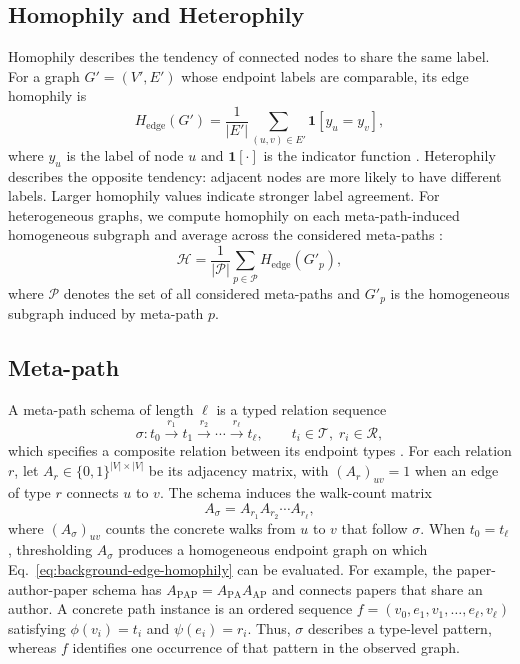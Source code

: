 \subsection{Homophily and Heterophily}
Homophily describes the tendency of connected nodes to share the same label. For a graph
$G'=(V',E')$ whose endpoint labels are comparable, its edge homophily is
\begin{equation}
  H_{\mathrm{edge}}(G')
  = \frac{1}{|E'|}\sum_{(u,v)\in E'}\mathbf{1}[y_u=y_v],
  \label{eq:background-edge-homophily}
\end{equation}
where $y_u$ is the label of node $u$ and $\mathbf{1}[\cdot]$ is the indicator function
\cite{zhu2020beyond}. Heterophily describes the opposite tendency: adjacent nodes are more likely to have different labels. Larger homophily values indicate stronger label agreement. For heterogeneous graphs, we compute homophily on each meta-path-induced homogeneous subgraph and average across the considered meta-paths \cite{shen2025UHGRL}:
\begin{equation}
    \mathcal{H}
    =
    \frac{1}{|\mathcal{P}|}
    \sum_{p \in \mathcal{P}}
    H_{\mathrm{edge}}(G'_p),
    \label{eq:overall-homophily}
\end{equation}
where $\mathcal{P}$ denotes the set of all considered meta-paths and $G'_p$ is the homogeneous subgraph induced by meta-path $p$.

\subsection{Meta-path}
A meta-path schema of length $\ell$ is a typed relation sequence
\begin{equation}
  \sigma:
  t_0 \xrightarrow{r_1} t_1 \xrightarrow{r_2}\cdots
  \xrightarrow{r_\ell} t_\ell,
  \qquad t_i\in\mathcal{T},\; r_i\in\mathcal{R},
  \label{eq:background-metapath-schema}
\end{equation}
which specifies a composite relation between its endpoint types \cite{sun2011pathsim}. For each
relation $r$, let $A_r\in\{0,1\}^{|V|\times|V|}$ be its adjacency matrix, with
$(A_r)_{uv}=1$ when an edge of type $r$ connects $u$ to $v$. The schema induces the walk-count
matrix
\begin{equation}
  A_\sigma=A_{r_1}A_{r_2}\cdots A_{r_\ell},
  \label{eq:background-metapath-adjacency}
\end{equation}
where $(A_\sigma)_{uv}$ counts the concrete walks from $u$ to $v$ that follow $\sigma$. When
$t_0=t_\ell$, thresholding $A_\sigma$ produces a homogeneous endpoint graph on which
Eq.~\eqref{eq:background-edge-homophily} can be evaluated. For example, the
paper-author-paper schema has $A_{\mathrm{PAP}}=A_{\mathrm{PA}}A_{\mathrm{AP}}$ and connects
papers that share an author. A concrete path instance is an ordered sequence
$f=(v_0,e_1,v_1,\ldots,e_\ell,v_\ell)$ satisfying $\phi(v_i)=t_i$ and $\psi(e_i)=r_i$. Thus,
$\sigma$ describes a type-level pattern, whereas $f$ identifies one occurrence of that pattern in
the observed graph.

